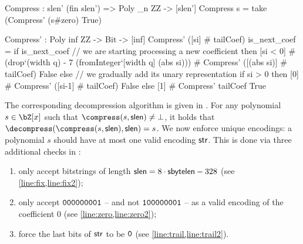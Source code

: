 \begin{algorithm}[!htp]
\caption{$\compress(s, \slen)$ \hfill}\label{alg:compress}
 \begin{algorithmic}[1]
 \State{$\str \gets \{\}$}
  
 \label{line:cbin}
 \label{line:k}
 \label{line:unary} 
 \EndFor
 \If{$(|\str| > \slen)$}\label{line:slen}
 \State{$\str \gets \bot$} \label{line:slenbot}
 \Else\label{line:else}
  \label{line:pad}
 \EndIf
 \Return{\str}
 \end{algorithmic}
\end{algorithm}

\begin{code}
  Compress : {slen'} (fin slen') => Poly _n ZZ -> [slen']
  Compress s = take (Compress' (s#zero) True)

  Compress' : Poly inf ZZ -> Bit -> [inf]
  Compress' ([si] # tailCoef) is_next_coef =
    if is_next_coef // we are starting processing a new coefficient
    then [si < 0]
         # (drop`{(width q) - 7} (fromInteger`{[width q]} (abs si)))
         # Compress' ([(abs si)] # tailCoef) False
    else // we gradually add its unary representation
      if si > 0
      then [0] # Compress' ([si-1] # tailCoef) False
      else [1] # Compress' tailCoef True
\end{code}

The corresponding decompression algorithm is given in \longdecompress. For any polynomial $s \in \bZ[x]$ such that $\compress(s, \slen) \neq \bot$, it holds that $\decompress ( \compress(s, \slen), \slen) = s$. We now enforce unique encodings: a polynomial $s$ should have at most one valid encoding $\textsf{str}$. This is done via three additional checks in \decompress:
\begin{enumerate}
	\item only accept bitstrings of length $\textsf{slen} = 8\cdot \textsf{sbytelen} - 328$ (see \cref{line:fix,line:fix2});
	\item only accept ${\tt 000000001}$ -- and not ${\tt 100000001}$ -- as a valid encoding of the coefficient $0$ (see \cref{line:zero,line:zero2});
	\item force the last bits of $\textsf{str}$ to be $\tt 0$ (see \cref{line:trail,line:trail2}).
\end{enumerate}

